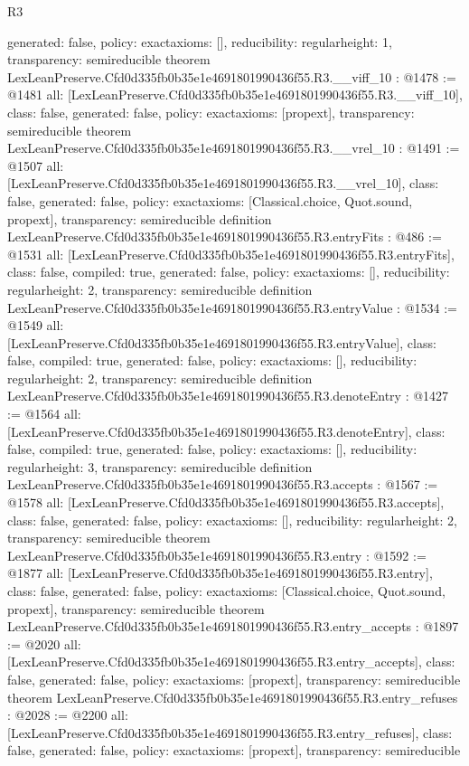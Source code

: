 \begin{lexlean}{R3}
\begin{coremodule}
{  generated: false,
  policy: exact{axioms: []},
  reducibility: regular{height: 1},
  transparency: semireducible
}
theorem LexLeanPreserve.Cfd0d335fb0b35e1e4691801990436f55.R3.__viff_10 : @1478 := @1481 {
  all: [LexLeanPreserve.Cfd0d335fb0b35e1e4691801990436f55.R3.__viff_10],
  class: false,
  generated: false,
  policy: exact{axioms: [propext]},
  transparency: semireducible
}
theorem LexLeanPreserve.Cfd0d335fb0b35e1e4691801990436f55.R3.__vrel_10 : @1491 := @1507 {
  all: [LexLeanPreserve.Cfd0d335fb0b35e1e4691801990436f55.R3.__vrel_10],
  class: false,
  generated: false,
  policy: exact{axioms: [Classical.choice, Quot.sound, propext]},
  transparency: semireducible
}
definition LexLeanPreserve.Cfd0d335fb0b35e1e4691801990436f55.R3.entryFits : @486 := @1531 {
  all: [LexLeanPreserve.Cfd0d335fb0b35e1e4691801990436f55.R3.entryFits],
  class: false,
  compiled: true,
  generated: false,
  policy: exact{axioms: []},
  reducibility: regular{height: 2},
  transparency: semireducible
}
definition LexLeanPreserve.Cfd0d335fb0b35e1e4691801990436f55.R3.entryValue : @1534 := @1549 {
  all: [LexLeanPreserve.Cfd0d335fb0b35e1e4691801990436f55.R3.entryValue],
  class: false,
  compiled: true,
  generated: false,
  policy: exact{axioms: []},
  reducibility: regular{height: 2},
  transparency: semireducible
}
definition LexLeanPreserve.Cfd0d335fb0b35e1e4691801990436f55.R3.denoteEntry : @1427 := @1564 {
  all: [LexLeanPreserve.Cfd0d335fb0b35e1e4691801990436f55.R3.denoteEntry],
  class: false,
  compiled: true,
  generated: false,
  policy: exact{axioms: []},
  reducibility: regular{height: 3},
  transparency: semireducible
}
definition LexLeanPreserve.Cfd0d335fb0b35e1e4691801990436f55.R3.accepts : @1567 := @1578 {
  all: [LexLeanPreserve.Cfd0d335fb0b35e1e4691801990436f55.R3.accepts],
  class: false,
  generated: false,
  policy: exact{axioms: []},
  reducibility: regular{height: 2},
  transparency: semireducible
}
theorem LexLeanPreserve.Cfd0d335fb0b35e1e4691801990436f55.R3.entry : @1592 := @1877 {
  all: [LexLeanPreserve.Cfd0d335fb0b35e1e4691801990436f55.R3.entry],
  class: false,
  generated: false,
  policy: exact{axioms: [Classical.choice, Quot.sound, propext]},
  transparency: semireducible
}
theorem LexLeanPreserve.Cfd0d335fb0b35e1e4691801990436f55.R3.entry_accepts : @1897 := @2020 {
  all: [LexLeanPreserve.Cfd0d335fb0b35e1e4691801990436f55.R3.entry_accepts],
  class: false,
  generated: false,
  policy: exact{axioms: [propext]},
  transparency: semireducible
}
theorem LexLeanPreserve.Cfd0d335fb0b35e1e4691801990436f55.R3.entry_refuses : @2028 := @2200 {
  all: [LexLeanPreserve.Cfd0d335fb0b35e1e4691801990436f55.R3.entry_refuses],
  class: false,
  generated: false,
  policy: exact{axioms: [propext]},
  transparency: semireducible
}


\end{coremodule}
\end{lexlean}
